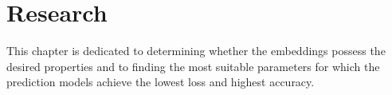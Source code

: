 
\chapter{Research} \label{chap:research}

This chapter is dedicated to determining whether the embeddings possess the desired properties and to finding the most suitable parameters for which the prediction models achieve the lowest loss and highest accuracy.





